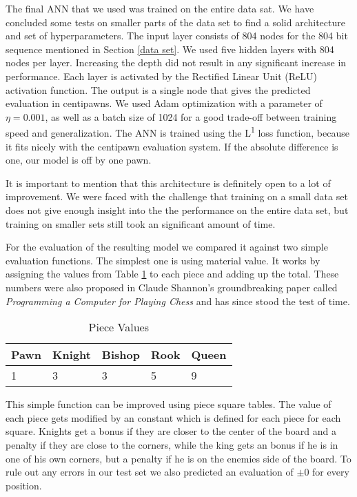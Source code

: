 \documentclass[conference]{IEEEtran}
\begin{document}
The final ANN that we used was trained on the entire data sat. We have concluded some tests on smaller parts of the data set to find a solid architecture and set of hyperparameters. The input layer consists of 804 nodes for the 804 bit sequence mentioned in Section \ref{data set}. We used five hidden layers with 804 nodes per layer. Increasing the depth did not result in any significant increase in performance. Each layer is activated by the Rectified Linear Unit (ReLU) activation function. The output is a single node that gives the predicted evaluation in centipawns. We used Adam optimization with a parameter of $\eta = 0.001$, as well as a batch size of 1024 for a good trade-off between training speed and generalization. The ANN is trained using the L\textsuperscript{1} loss function, because it fits nicely with the centipawn evaluation system. If the absolute difference is one, our model is off by one pawn. 

It is important to mention that this architecture is definitely open to a lot of improvement. We were faced with the challenge that training on a small data set does not give enough insight into the the performance on the entire data set, but training on smaller sets still took an significant amount of time.

For the evaluation of the resulting model we compared it against two simple evaluation functions. The simplest one is using material value. It works by assigning the values from Table \ref{piece table} to each piece and adding up the total. These numbers were also proposed in Claude Shannon's groundbreaking paper called \emph{Programming a Computer for Playing Chess} \cite{b4} and has since stood the test of time. 

\begin{table}[htbp]
\caption{Piece Values}
\begin{center}
\begin{tabular}{|l|l|l|l|l|}
\hline
Pawn & Knight & Bishop & Rook & Queen \\ \hline
1 & 3 & 3 & 5 & 9 \\ \hline
\end{tabular}
\label{piece table}
\end{center}
\end{table}

This simple function can be improved using piece square tables. The value of each piece gets modified by an constant which is defined for each piece for each square. Knights get a bonus if they are closer to the center of the board and a penalty if they are close to the corners, while the king gets an bonus if he is in one of his own corners, but a penalty if he is on the enemies side of the board. To rule out any errors in our test set we also predicted an evaluation of $\pm$0 for every position.
\end{document}
